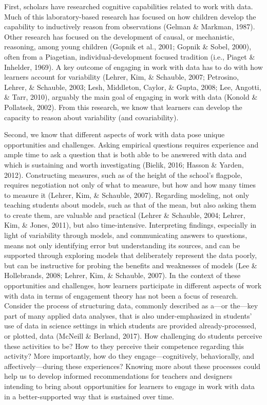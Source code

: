 \documentclass[]{book}
\theoremstyle{definition}
\theoremstyle{definition}
\theoremstyle{definition}
\theoremstyle{remark}
\begin{document}
First, scholars have researched cognitive capabilities related to work
with data. Much of this laboratory-based research has focused on how
children develop the capability to inductively reason from observations
(Gelman \& Markman, 1987). Other research has focused on the development
of causal, or mechanistic, reasoning, among young children (Gopnik et
al., 2001; Gopnik \& Sobel, 2000), often from a Piagetian,
individual-development focused tradition (i.e., Piaget \& Inhelder,
1969). A key outcome of engaging in work with data has to do with how
learners account for variability (Lehrer, Kim, \& Schauble, 2007;
Petrosino, Lehrer, \& Schauble, 2003; Lesh, Middleton, Caylor, \& Gupta,
2008; Lee, Angotti, \& Tarr, 2010), arguably the main goal of engaging
in work with data (Konold \& Pollatsek, 2002). From this research, we
know that learners can develop the capacity to reason about variability
(and covariability).

Second, we know that different aspects of work with data pose unique
opportunities and challenges. Asking empirical questions requires
experience and ample time to ask a question that is both able to be
answered with data and which is sustaining and worth investigating
(Bielik, 2016; Hasson \& Yarden, 2012). Constructing measures, such as
of the height of the school's flagpole, requires negotiation not only of
what to measure, but how and how many times to measure it (Lehrer, Kim,
\& Schauble, 2007). Regarding modeling, not only teaching students about
models, such as that of the mean, but also asking them to create them,
are valuable and practical (Lehrer \& Schauble, 2004; Lehrer, Kim, \&
Jones, 2011), but also time-intensive. Interpreting findings, especially
in light of variability through models, and communicating answers to
questions, means not only identifying error but understanding its
sources, and can be supported through exploring models that deliberately
represent the data poorly, but can be instructive for probing the
benefits and weaknesses of models (Lee \& Hollebrands, 2008; Lehrer,
Kim, \& Schauble, 2007). In the context of these opportunities and
challenges, how learners participate in different aspects of work with
data in terms of engagement theory has not been a focus of research.
Consider the process of structuring data, commonly described as a---or
the---key part of many applied data analyses, that is also
under-emphasized in students' use of data in science settings in which
students are provided already-processed, or plotted, data (McNeill \&
Berland, 2017). How challenging do students perceive these activities to
be? How to they perceive their competence regarding this activity? More
importantly, how do they engage---cognitively, behaviorally, and
affectively---during these experiences? Knowing more about these
processes could help us to develop informed recommendations for teachers
and designers intending to bring about opportunities for learners to
engage in work with data in a better-supported way that is sustained
over time.
\end{document}
